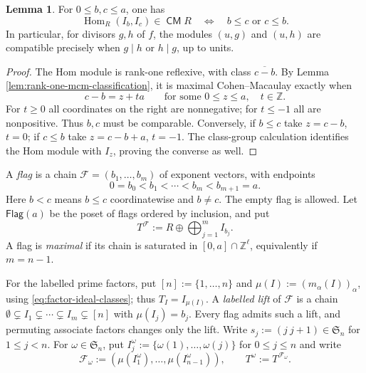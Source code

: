 \documentclass[a4paper,reqno]{amsart}
\def\F{\mathcal{F}}
\DeclareMathOperator{\CM}{\mathsf{CM}}
\DeclareMathOperator{\Hom}{Hom}
\theoremstyle{definition}
\newtheorem{Lem}[Thm]{Lemma}
\begin{document}
\begin{Lem}\label{lem:factor-hom-compatibility}
For $0\le b,c\le a$, one has
\begin{equation}\label{eq:factor-hom-compatibility}
\Hom_R(I_b,I_c)\in\CM R
\quad\Longleftrightarrow\quad b\le c\text{ or }c\le b.
\end{equation}
In particular, for divisors $g,h$ of $f$, the modules $(u,g)$ and $(u,h)$ are compatible precisely when $g\mid h$ or $h\mid g$, up to units.
\end{Lem}
\begin{proof}
The Hom module is rank-one reflexive, with class $\overline{c-b}$. By Lemma \ref{lem:rank-one-mcm-classification}, it is maximal Cohen--Macaulay exactly when
\[
c-b=z+ta\qquad\text{for some }0\le z\le a,\quad t\in\mathbb Z.
\]
For $t\ge0$ all coordinates on the right are nonnegative; for $t\le-1$ all are nonpositive. Thus $b,c$ must be comparable. Conversely, if $b\le c$ take $z=c-b$, $t=0$; if $c\le b$ take $z=c-b+a$, $t=-1$. The class-group calculation identifies the Hom module with $I_z$, proving the converse as well.
\end{proof}

A \emph{flag} is a chain $\F=(b_1,\ldots,b_m)$ of exponent vectors, with endpoints
\[
0=b_0<b_1<\cdots<b_m<b_{m+1}=a.
\]
Here $b<c$ means $b\le c$ coordinatewise and $b\ne c$. The empty flag is allowed. Let $\mathsf{Flag}(a)$ be the poset of flags ordered by inclusion, and put
\[
T^\F:=R\oplus\bigoplus_{j=1}^m I_{b_j}.
\]
A flag is \emph{maximal} if its chain is saturated in $[0,a]\cap\mathbb Z^\ell$, equivalently if $m=n-1$.

For the labelled prime factors, put $[n]:=\{1,\ldots,n\}$ and $\mu(I):=(m_\alpha(I))_\alpha$, using \eqref{eq:factor-ideal-classes}; thus $T_I=I_{\mu(I)}$. A \emph{labelled lift} of $\F$ is a chain $\emptyset\subsetneq I_1\subsetneq\cdots\subsetneq I_m\subsetneq[n]$ with $\mu(I_j)=b_j$. Every flag admits such a lift, and permuting associate factors changes only the lift. Write $s_j:=(j\ j+1)\in\mathfrak S_n$ for $1\le j<n$. For $\omega\in\mathfrak S_n$, put $I_j^\omega:=\{\omega(1),\ldots,\omega(j)\}$ for $0\le j\le n$ and write
\[
\F_\omega:=(\mu(I_1^\omega),\ldots,\mu(I_{n-1}^\omega)),\qquad
T^\omega:=T^{\F_\omega}.
\]
\end{document}
